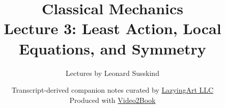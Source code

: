 \documentclass[11pt,oneside]{book}
\begin{document}
\hypersetup{pageanchor=false}
\frontmatter
\title{Classical Mechanics\\[0.45em]
\large Lecture 3: Least Action, Local Equations, and Symmetry}
\author{Lectures by Leonard Susskind}
\date{Transcript-derived companion notes curated by
\href{https://lazying.art}{LazyingArt LLC}\\[0.35em]
\small Produced with
\href{https://github.com/lachlanchen/Video2Book}{Video2Book}}
\maketitle
\hypersetup{pageanchor=true}
\mainmatter

\end{document}

